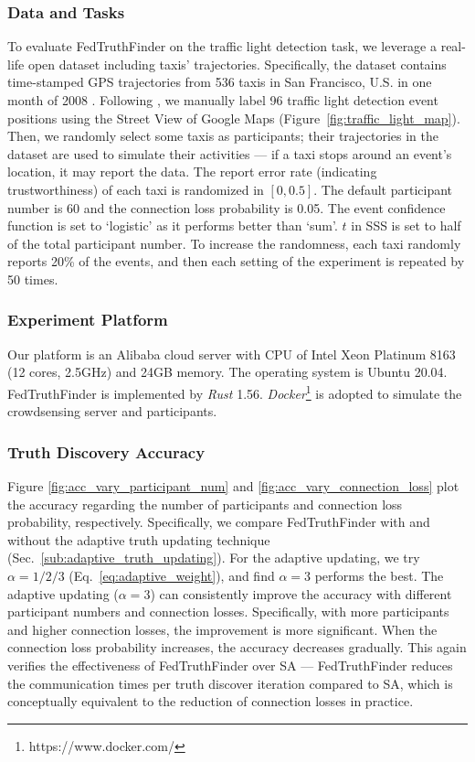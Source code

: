 \subsubsection{Data and Tasks} To evaluate FedTruthFinder on the traffic light detection task, we leverage a real-life open dataset including taxis' trajectories. Specifically, the dataset contains time-stamped GPS trajectories from 536 taxis in San Francisco, U.S. in one month of 2008 \citep{epflmobility}. Following \citet{ouyang2015truth}, we manually label 96 traffic light detection event positions using the Street View of Google Maps (Figure~\ref{fig:traffic_light_map}). Then, we randomly select some taxis as participants; their trajectories in the dataset are used to simulate their activities --- if a taxi stops around an event's location, it may report the data. The report error rate (indicating trustworthiness) of each taxi is randomized in $[0,0.5]$. The default participant number is 60 and the connection loss probability is 0.05. The event confidence function is set to `logistic' as it performs better than `sum'. $t$ in SSS is set to half of the total participant number. To increase the randomness, each taxi randomly reports 20\% of the events, and then each setting of the experiment is repeated by 50 times.

\subsubsection{Experiment Platform} Our platform is an Alibaba cloud server with CPU of Intel Xeon Platinum 8163 (12 cores, 2.5GHz) and 24GB memory. The operating system is Ubuntu 20.04. FedTruthFinder is implemented by \textit{Rust} 1.56. \textit{Docker}\footnote{https://www.docker.com/} is adopted to simulate the crowdsensing server and participants.


\subsubsection{Truth Discovery Accuracy} Figure \ref{fig:acc_vary_participant_num} and \ref{fig:acc_vary_connection_loss} plot the accuracy regarding the number of participants and connection loss probability, respectively. Specifically, we compare FedTruthFinder with and without the adaptive truth updating technique (Sec.~\ref{sub:adaptive_truth_updating}). For the adaptive updating, we try $\alpha=1/2/3$ (Eq.~\ref{eq:adaptive_weight}), and find $\alpha=3$ performs the best. The adaptive updating ($\alpha=3$) can consistently improve the accuracy with different participant numbers and connection losses. Specifically, with more participants and higher connection losses, the improvement is more significant. When the connection loss probability increases, the accuracy decreases gradually. This again verifies the effectiveness of FedTruthFinder over SA \citep{Xu2019EfficientAP} --- FedTruthFinder reduces the communication times per truth discover iteration compared to SA, which is conceptually equivalent to the reduction of connection losses in practice.


